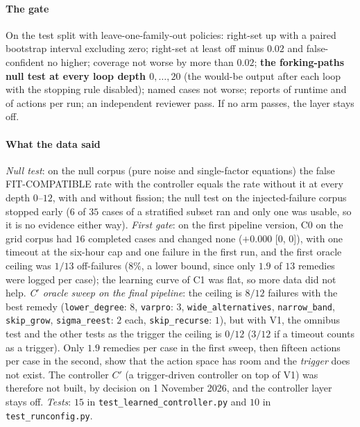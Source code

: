\documentclass[11pt]{article}
\theoremstyle{plain}
\theoremstyle{definition}
\theoremstyle{remark}
\newcommand{\lab}[1]{\textsf{#1}}           %
\newcommand{\FC}{\lab{FIT-COMPATIBLE}}
\begin{document}
\paragraph{The gate} On the test split with leave-one-family-out policies: right-set up with a paired bootstrap interval excluding zero; right-set at least off minus $0.02$ and false-confident no higher; coverage not worse by more than $0.02$; \textbf{the forking-paths null test at every loop depth $0,\dots,20$} (the would-be output after each loop with the stopping rule disabled); named cases not worse; reports of runtime and of actions per run; an independent reviewer pass. If no arm passes, the layer stays off.

\paragraph{What the data said} \emph{Null test}: on the null corpus (pure noise and single-factor equations) the false \FC{} rate with the controller equals the rate without it at every depth $0$--$12$, with and without fission; the null test on the injected-failure corpus stopped early ($6$ of $35$ cases of a stratified subset ran and only one was usable, so it is no evidence either way).
\emph{First gate}: on the first pipeline version, C0 on the grid corpus had $16$ completed cases and changed none ($+0.000$ [$0$, $0$]), with one timeout at the six-hour cap and one failure in the first run, and the first oracle ceiling was $1/13$ off-failures ($8\%$, a lower bound, since only $1.9$ of $13$ remedies were logged per case); the learning curve of C1 was flat, so more data did not help.
\emph{C$'$ oracle sweep on the final pipeline}: the ceiling is $8/12$ failures with the best remedy (\texttt{lower\_degree}: $8$, \texttt{varpro}: $3$, \texttt{wide\_alternatives}, \texttt{narrow\_band}, \texttt{skip\_grow}, \texttt{sigma\_reest}: $2$ each, \texttt{skip\_recurse}: $1$), but with V1, the omnibus test and the other tests as the trigger the ceiling is $0/12$ ($3/12$ if a timeout counts as a trigger).
Only $1.9$ remedies per case in the first sweep, then fifteen actions per case in the second, show that the action space has room and the \emph{trigger} does not exist. The controller $C'$ (a trigger-driven controller on top of V1) was therefore not built, by decision on 1 November 2026, and the controller layer stays off.
\emph{Tests}: $15$ in \texttt{test\_learned\_controller.py} and $10$ in \texttt{test\_runconfig.py}.
\end{document}
